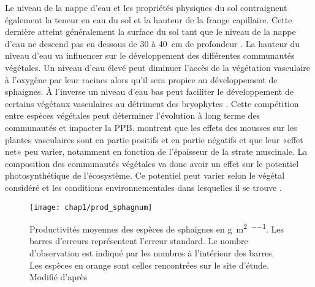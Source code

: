 Le niveau de la nappe d'eau et les propriétés physiques du sol contraignent également la teneur en eau du sol et la hauteur de la frange capillaire.
Cette dernière atteint généralement la surface du sol tant que le niveau de la nappe d'eau ne descend pas en dessous de \num{30} à \SI{40}{\centi\metre} de profondeur \citep{laiho2006}.
La hauteur du niveau d'eau va influencer sur le développement des différentes communautés végétales.
Un niveau d'eau élevé peut diminuer l'accès de la végétation vasculaire à l'oxygène par leur racines alors qu'il sera propice au développement de sphaignes.
À l'inverse un niveau d'eau bas peut faciliter le développement de certains végétaux vasculaires au détriment des bryophytes \plop.
Cette compétition entre espèces végétales peut déterminer l'évolution à long terme des communautés et impacter la PPB.
\citet{gornall2011} montrent que les effets des mousses sur les plantes vasculaires sont en partie positifs et en partie négatifs et que leur «effet net» peu varier, notamment en fonction de l'épaisseur de la strate muscinale.
La composition des communautés végétales va donc avoir un effet sur le potentiel photosynthétique de l'écosystème.
Ce potentiel peut varier selon le végétal considéré et les conditions environnementales dans lesquelles il se trouve \citep{moore2002}.

\begin{figure}
\centering
\texttt{[image: chap1/prod\_sphagnum]}
\caption{Productivités moyennes des espèces de sphaignes en \si{\gram\per\square\metre\per\year}. Les barres d'erreurs représentent l'erreur standard. Le nombre d'observation est indiqué par les nombres à l'intérieur des barres. Les espèces en orange sont celles rencontrées sur le site d'étude. Modifié d'après \citet{gunnarsson2005}}
\label{fig:prod_sphagnum}
\end{figure}

